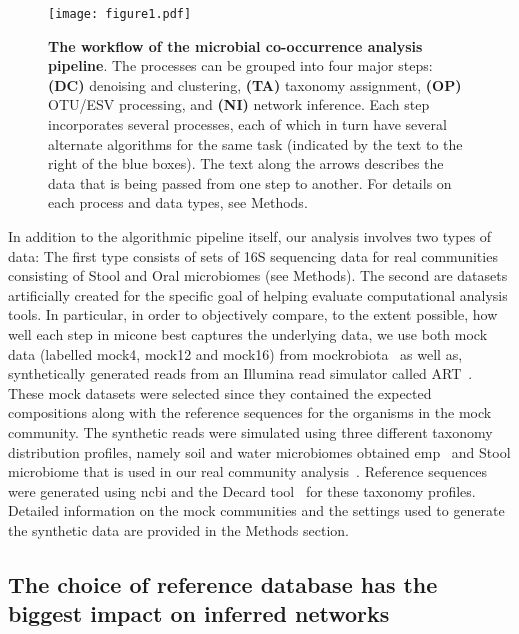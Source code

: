  \begin{figure}[h]
    \centering
    \texttt{[image: figure1.pdf]}
    \caption{
      \textbf{The workflow of the microbial co-occurrence analysis pipeline}.
      The processes can be grouped into four major steps: \textbf{(DC)} denoising and clustering, \textbf{(TA)} taxonomy assignment, \textbf{(OP)} OTU/ESV processing, and \textbf{(NI)} network inference.
      Each step incorporates several processes, each of which in turn have several alternate algorithms for the same task (indicated by the text to the right of the blue boxes).
      The text along the arrows describes the data that is being passed from one step to another. For details on each process and data types, see Methods.
    }
    \label{fig:figure1}
  \end{figure}

  In addition to the algorithmic pipeline itself, our analysis involves two types of data: The first type consists of sets of 16S sequencing data for real communities consisting of Stool and Oral microbiomes (see Methods).
  The second are datasets artificially created for the specific goal of helping evaluate computational analysis tools.
  In particular, in order to objectively compare, to the extent possible, how well each step in \ac{micone} best captures the underlying data, we use both mock data (labelled mock4, mock12 and mock16) from mockrobiota~\cite{Bokulich2016} as well as, synthetically generated reads from an Illumina read simulator called ART~\cite{Huang2012}.
  These mock datasets were selected since they contained the expected compositions along with the reference sequences for the organisms in the mock community.
  The synthetic reads were simulated using three different taxonomy distribution profiles, namely soil and water microbiomes obtained \ac{emp}~\cite{Thompson2017} and Stool microbiome that is used in our real community analysis~\cite{Kang2017}.
  Reference sequences were generated using \ac{ncbi} and the Decard tool~\cite{Golob2017} for these taxonomy profiles.
  Detailed information on the mock communities and the settings used to generate the synthetic data are provided in the Methods section.


  \FloatBarrier

  \subsection*{The choice of reference database has the biggest impact on inferred networks}

